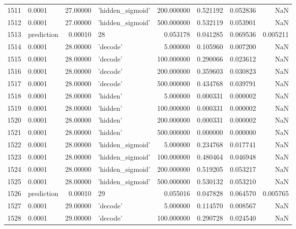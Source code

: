 \documentclass[10pt,a4paper]{article}
\begin{document}
\begin{tabular}{llrlrrrr}
1511 &      0.0001 &  27.00000 &   'hidden\_sigmoid' &  200.000000 &  0.521192 &  0.052836 &       NaN \\
1512 &      0.0001 &  27.00000 &   'hidden\_sigmoid' &  500.000000 &  0.532119 &  0.053901 &       NaN \\
1513 &  prediction &   0.00010 &                 28 &    0.053178 &  0.041285 &  0.069536 &  0.005211 \\
1514 &      0.0001 &  28.00000 &           'decode' &    5.000000 &  0.105960 &  0.007200 &       NaN \\
1515 &      0.0001 &  28.00000 &           'decode' &  100.000000 &  0.290066 &  0.023612 &       NaN \\
1516 &      0.0001 &  28.00000 &           'decode' &  200.000000 &  0.359603 &  0.030823 &       NaN \\
1517 &      0.0001 &  28.00000 &           'decode' &  500.000000 &  0.434768 &  0.039791 &       NaN \\
1518 &      0.0001 &  28.00000 &           'hidden' &    5.000000 &  0.000331 &  0.000002 &       NaN \\
1519 &      0.0001 &  28.00000 &           'hidden' &  100.000000 &  0.000331 &  0.000002 &       NaN \\
1520 &      0.0001 &  28.00000 &           'hidden' &  200.000000 &  0.000331 &  0.000002 &       NaN \\
1521 &      0.0001 &  28.00000 &           'hidden' &  500.000000 &  0.000000 &  0.000000 &       NaN \\
1522 &      0.0001 &  28.00000 &   'hidden\_sigmoid' &    5.000000 &  0.234768 &  0.017741 &       NaN \\
1523 &      0.0001 &  28.00000 &   'hidden\_sigmoid' &  100.000000 &  0.480464 &  0.046948 &       NaN \\
1524 &      0.0001 &  28.00000 &   'hidden\_sigmoid' &  200.000000 &  0.519205 &  0.053217 &       NaN \\
1525 &      0.0001 &  28.00000 &   'hidden\_sigmoid' &  500.000000 &  0.530132 &  0.053210 &       NaN \\
1526 &  prediction &   0.00010 &                 29 &    0.055016 &  0.047828 &  0.064570 &  0.005765 \\
1527 &      0.0001 &  29.00000 &           'decode' &    5.000000 &  0.114570 &  0.008567 &       NaN \\
1528 &      0.0001 &  29.00000 &           'decode' &  100.000000 &  0.290728 &  0.024540 &       NaN \\

\end{tabular}
\end{document}
